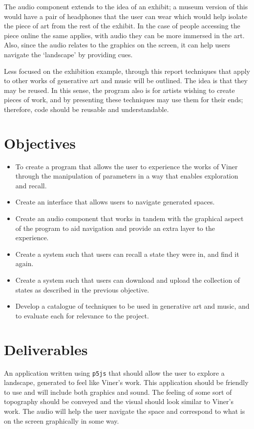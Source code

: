 The audio component extends to the idea of an exhibit; a museum version of this
would have a pair of headphones that the user can wear which would help isolate the
piece of art from the rest of the exhibit. In the case of people accessing the
piece online the same applies, with audio they can be more immersed in the art.
Also, since the audio relates to the graphics on the screen, it can help users
navigate the `landscape' by providing cues.

Less focused on the exhibition example, through this report techniques that
apply to other works of generative art and music will be outlined. The idea is
that they may be reused. In this sense, the program also is for artists wishing
to create pieces of work, and by presenting these techniques may use them for
their ends; therefore, code should be reusable and understandable.

\section{Objectives}
\begin{itemize}
    \item To create a program that allows the user to experience the works of
        Viner through the manipulation of parameters in a way that enables
        exploration and recall. 
    \item Create an interface that allows users to navigate generated spaces.
    \item Create an audio component that works in tandem with the graphical aspect
        of the program to aid navigation and provide an extra layer to the
        experience.
    \item Create a system such that users can recall a state they were
        in, and find it again.
    \item Create a system such that users can download and upload the collection
        of states as described in the previous objective.
    \item Develop a catalogue of techniques to be used in generative art and
        music, and to evaluate each for relevance to the project.
\end{itemize}

\section{Deliverables}
An application written using \verb|p5js| that should allow the user to explore a
landscape, generated to feel like Viner's work. This application should be
friendly to use and will include both graphics and sound. The feeling of some
sort of topography should be conveyed and the visual should look similar to
Viner's work. The audio will help the user navigate the space and correspond to
what is on the screen graphically in some way.

